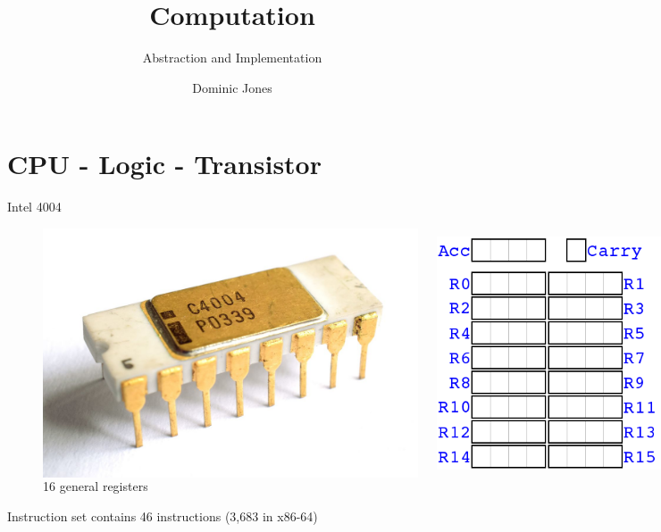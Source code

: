 \documentclass[xcolor=dvipsnames]{beamer}
\title{Computation}
\subtitle{Abstraction and Implementation}
\author{Dominic Jones}
\date{}
\begin{document}
\begin{frame}[plain]
  \titlepage
\end{frame}


\section{CPU - Logic - Transistor}


\begin{frame}{Intel 4004}
\begin{figure}
  \centering
  \begin{columns}
    \centering
    \caption {4-bit data, 2,300 transistors}
    \includegraphics[width=0.99\textwidth]{intel_4004_chip}
    \centering
    \caption {16 general registers}
    \includegraphics[width=0.99\textwidth]{intel_4004_registers}
  \end{columns}
\end{figure}
Instruction set contains 46 instructions (3,683 in x86-64)
\end{frame}
\end{document}
